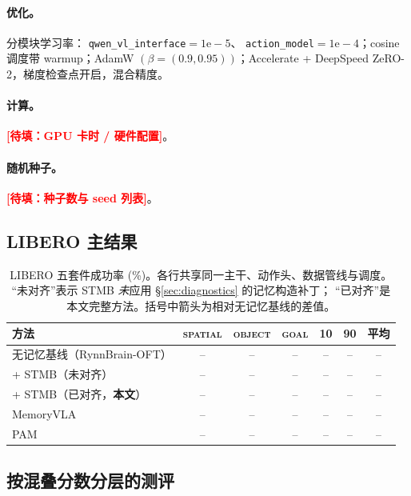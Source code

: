 \documentclass[11pt]{ctexart}
\newcommand{\todo}[1]{\textcolor{red}{\textbf{[待填：#1]}}}
\newcommand{\num}{--}
\begin{document}
\paragraph{优化。} 分模块学习率：
\texttt{qwen\_vl\_interface}$=1\mathrm{e}{-}5$、
\texttt{action\_model}$=1\mathrm{e}{-}4$；cosine 调度带 warmup；AdamW
$(\beta{=}(0.9, 0.95))$；Accelerate + DeepSpeed ZeRO-2，梯度检查点开启，混合精度。

\paragraph{计算。} \todo{GPU 卡时 / 硬件配置}。 \paragraph{随机种子。}
\todo{种子数与 seed 列表}。

\subsection{LIBERO 主结果}

\begin{table}[h]
\centering
\caption{LIBERO 五套件成功率 (\%)。各行共享同一主干、动作头、数据管线与调度。
“未对齐”表示 STMB \emph{未}应用 \S\ref{sec:diagnostics} 的记忆构造补丁；
“已对齐”是本文完整方法。括号中箭头为相对无记忆基线的差值。}
\label{tab:libero}
\small
\begin{tabular}{lcccccc}
\toprule
方法 & \textsc{spatial} & \textsc{object} & \textsc{goal} & \textsc{10} & \textsc{90} & 平均 \\
\midrule
无记忆基线（RynnBrain-OFT）            & \num & \num & \num & \num & \num & \num \\
\quad + STMB（未对齐）                 & \num & \num & \num & \num & \num & \num \\
\quad + STMB（已对齐，\textbf{本文}）  & \num & \num & \num & \num & \num & \num \\
\midrule
MemoryVLA~\cite{shi2025memoryvla}      & \num & \num & \num & \num & \num & \num \\
PAM~\cite{pam2025}                     & \num & \num & \num & \num & \num & \num \\
\bottomrule
\end{tabular}
\end{table}

\subsection{按混叠分数分层的测评}
\label{sec:exp-alias}
\end{document}
